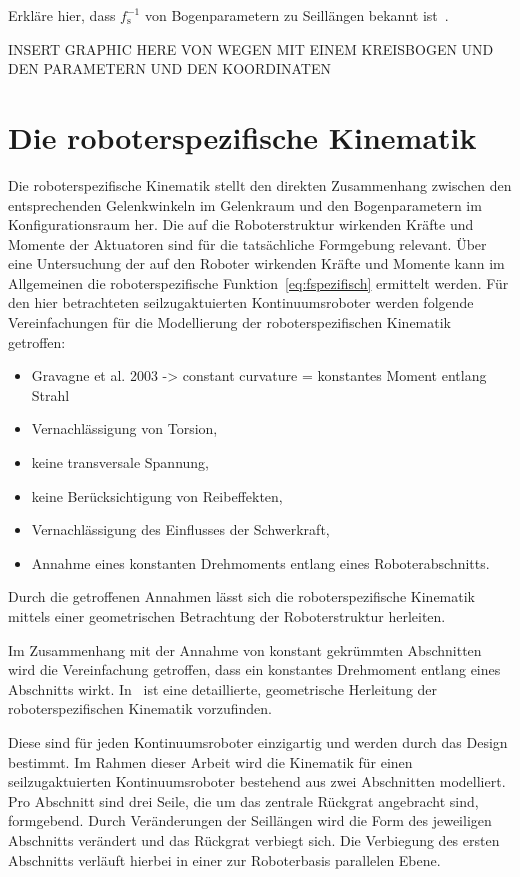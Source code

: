 Erkläre hier, dass $f^{-1}_\mathrm{s}$ von Bogenparametern zu Seillängen bekannt ist~\cite{JW06}.


INSERT GRAPHIC HERE VON WEGEN MIT EINEM KREISBOGEN UND DEN PARAMETERN UND DEN KOORDINATEN
\section{Die roboterspezifische Kinematik}
\label{sec:spezifischeKinematik}

Die roboterspezifische Kinematik stellt den direkten Zusammenhang zwischen den entsprechenden Gelenkwinkeln im Gelenkraum und den Bogenparametern im Konfigurationsraum her. Die auf die Roboterstruktur wirkenden Kräfte und Momente der Aktuatoren sind für die tatsächliche Formgebung relevant. Über eine Untersuchung der auf den Roboter wirkenden Kräfte und Momente kann im Allgemeinen die roboterspezifische Funktion~\eqref{eq:fspezifisch} ermittelt werden. Für den hier betrachteten seilzugaktuierten Kontinuumsroboter werden folgende Vereinfachungen für die Modellierung der roboterspezifischen Kinematik getroffen:

\begin{itemize}
\item Gravagne et al. 2003 -> constant curvature = konstantes Moment entlang Strahl
\end{itemize}

\begin{itemize}
\item Vernachlässigung von Torsion,
\item keine transversale Spannung,
\item keine Berücksichtigung von Reibeffekten,
\item Vernachlässigung des Einflusses der Schwerkraft,
\item Annahme eines konstanten Drehmoments entlang eines Roboterabschnitts.
\end{itemize}

Durch die getroffenen Annahmen lässt sich die roboterspezifische Kinematik mittels einer geometrischen Betrachtung der Roboterstruktur herleiten. 

Im Zusammenhang mit der Annahme von konstant gekrümmten Abschnitten wird die Vereinfachung getroffen, dass ein konstantes Drehmoment entlang eines Abschnitts wirkt. In~\cite{JW06} ist eine detaillierte, geometrische Herleitung der roboterspezifischen Kinematik vorzufinden. 

Diese sind für jeden Kontinuumsroboter einzigartig und werden durch das Design bestimmt. Im Rahmen dieser Arbeit wird die Kinematik für einen seilzugaktuierten Kontinuumsroboter bestehend aus zwei Abschnitten modelliert. Pro Abschnitt sind drei Seile, die um das zentrale Rückgrat angebracht sind, formgebend. Durch Veränderungen der Seillängen wird die Form des jeweiligen Abschnitts verändert und das Rückgrat verbiegt sich. Die Verbiegung des ersten Abschnitts verläuft hierbei in einer zur Roboterbasis parallelen Ebene. 

